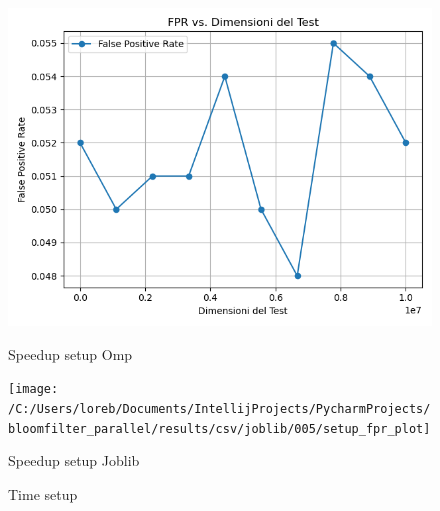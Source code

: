 \documentclass[11pt]{article}
\begin{document}
    \begin{figure}[H]
        \centering
        \includegraphics[width=\linewidth]{omp/005/setup_fpr_plot}
            \caption{Speedup setup Omp}\label{fig:005-setup_fpr_omp}
        \endminipage\hfill
        \texttt{[image: /C:/Users/loreb/Documents/IntellijProjects/PycharmProjects/bloomfilter\_parallel/results/csv/joblib/005/setup\_fpr\_plot]}
            \caption{Speedup setup Joblib}\label{fig:005-setup_fpr_joblib}
        \endminipage\hfill
        \caption{Time setup}
    \end{figure}
\end{document}
